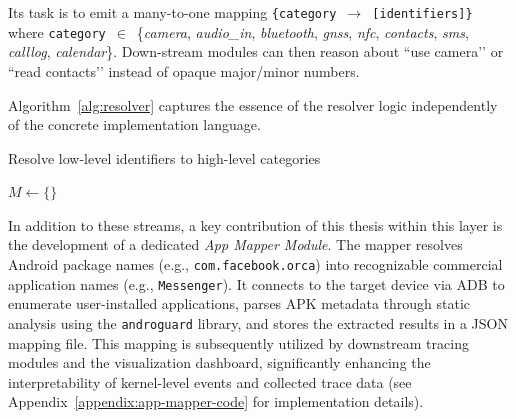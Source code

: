 \documentclass[a4paper,12pt]{report}
\begin{document}
Its task is to emit a many-to-one mapping
\texttt{\{category $\rightarrow$ [identifiers]\}} where
\texttt{category}~$\in$~\{\textit{camera}, \textit{audio\_in},
\textit{bluetooth}, \textit{gnss}, \textit{nfc},
\textit{contacts}, \textit{sms}, \textit{calllog},
\textit{calendar}\}.
Down-stream modules can then reason about ``use camera’’ or ``read
contacts’’ instead of opaque major/minor numbers.

Algorithm~\ref{alg:resolver} captures the essence of the resolver logic
independently of the concrete implementation language.

\begin{algorithm}[H]
\footnotesize
\caption{Resolve low-level identifiers to high-level categories}
\label{alg:resolver}
\DontPrintSemicolon
{}
$M \leftarrow \{\}$
\BlankLine
{}
\BlankLine
{}
\end{algorithm}
\BlankLine
\BlankLine
In addition to these streams, a key contribution of this thesis within this layer is the development of a dedicated \emph{App Mapper Module}. The mapper resolves Android package names (e.g., \texttt{com.facebook.orca}) into recognizable commercial application names (e.g., \texttt{Messenger}). It connects to the target device via ADB to enumerate user-installed applications, parses APK metadata through static analysis using the \texttt{androguard} library, and stores the extracted results in a JSON mapping file. This mapping is subsequently utilized by downstream tracing modules and the visualization dashboard, significantly enhancing the interpretability of kernel-level events and collected trace data (see Appendix~\ref{appendix:app-mapper-code} for implementation details).
\end{document}
